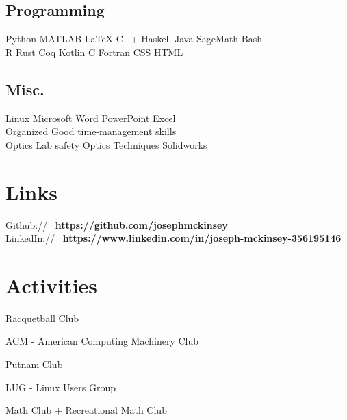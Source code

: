 \documentclass[]{deedy-resume-openfont}
\begin{document}
\begin{minipage}[t]{0.42\textwidth}
\subsection{Programming}
 Python \textbullet{} MATLAB \textbullet{} \LaTeX
\textbullet{} C++ \textbullet{}
Haskell \textbullet{} Java \textbullet{} SageMath \textbullet{} Bash \\
R \textbullet{} Rust \textbullet{} Coq \textbullet{} Kotlin \textbullet{} C
\textbullet{}  Fortran \textbullet{} CSS \textbullet{} HTML \\
\sectionsep

\subsection{Misc.}
Linux \textbullet{} Microsoft Word \textbullet PowerPoint \textbullet Excel \\
Organized \textbullet{} Good time-management skills \\
Optics Lab safety \textbullet{} Optics Techniques \textbullet{} Solidworks \\
\sectionsep



\section{Links} 
Github:// \, \href{https://github.com/josephmckinsey}{\bf https://github.com/josephmckinsey} \\
LinkedIn:// \, \href{https://www.linkedin.com/in/joseph-mckinsey-356195146/}{\bf https://www.linkedin.com/in/joseph-mckinsey-356195146} \\
\sectionsep

\section{Activities}
\vspace{\topsep} %
\begin{tightemize}
\item Racquetball Club
\item ACM - American Computing Machinery Club
\item Putnam Club
\item LUG - Linux Users Group
\item Math Club + Recreational Math Club
\end{tightemize}
\sectionsep

%
%

\end{minipage} 
\end{document}
